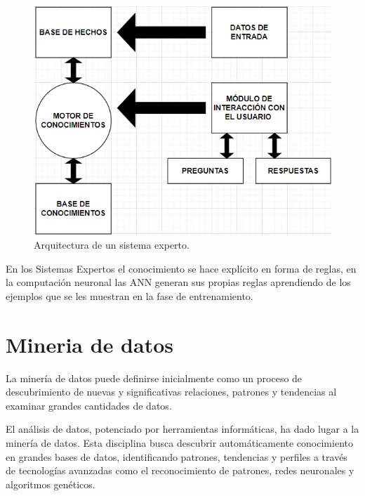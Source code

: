 \begin{itemize}
        \begin{figure}[H]
          \begin{center}
            \includegraphics[scale=0.70]{./hechos.png}
            \caption{Arquitectura de un sistema experto.}
            \label{fig:Arquitectura de un sistema experto}
          \end{center}
        \end{figure}

        En los Sistemas Expertos el conocimiento se hace explícito en forma de reglas,
        en la computación neuronal las ANN generan sus propias reglas aprendiendo de
        los ejemplos que se les muestran en la fase de
        entrenamiento\cite{olabe1998redes}.

\end{itemize}

\section{Mineria de datos}
La minería de datos puede definirse inicialmente como un proceso de
descubrimiento de nuevas y significativas relaciones, patrones y tendencias al
examinar grandes cantidades de datos\cite{perez2007mineria}.

\vspace{1\baselineskip}
El análisis de datos, potenciado por herramientas informáticas, ha dado lugar a la minería de datos. Esta disciplina busca descubrir automáticamente conocimiento en grandes bases de datos, identificando patrones, tendencias y perfiles a través de tecnologías avanzadas como el reconocimiento de patrones, redes neuronales y algoritmos genéticos.

